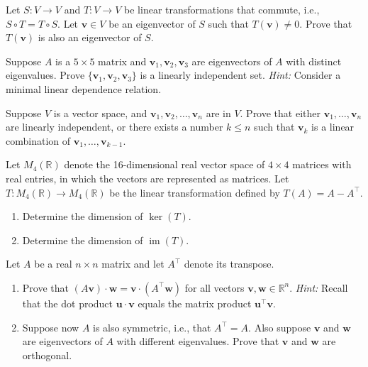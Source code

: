 \documentclass[11pt,twoside,openany]{memoir}
\begin{document}
        \begin{exercise}
        Let $S: V \to V$ and $T: V \to V$ be linear transformations that commute, i.e., $S \circ T = T \circ S$. Let $\mathbf{v} \in V$ be an eigenvector of $S$ such that $T(\mathbf{v}) \ne 0$. Prove that $T(\mathbf{v})$ is also an eigenvector of $S$.
        \end{exercise}
        
        \begin{exercise}
        Suppose $A$ is a $5 \times 5$ matrix and $\mathbf{v}_1, \mathbf{v}_2, \mathbf{v}_3$ are eigenvectors of $A$ with distinct eigenvalues. Prove $\{\mathbf{v}_1, \mathbf{v}_2, \mathbf{v}_3\}$ is a linearly independent set. \textit{Hint:} Consider a minimal linear dependence relation.
        \end{exercise}
        
        \begin{exercise}
        Suppose $V$ is a vector space, and $\mathbf{v}_1, \mathbf{v}_2, \ldots, \mathbf{v}_n$ are in $V$. Prove that either $\mathbf{v}_1, \ldots, \mathbf{v}_n$ are linearly independent, or there exists a number $k \le n$ such that $\mathbf{v}_k$ is a linear combination of $\mathbf{v}_1, \ldots, \mathbf{v}_{k-1}$.
        \end{exercise}
        
        \begin{exercise}
        Let $M_4(\mathbb{R})$ denote the 16-dimensional real vector space of $4 \times 4$ matrices with real entries, in which the vectors are represented as matrices. Let $T: M_4(\mathbb{R}) \to M_4(\mathbb{R})$ be the linear transformation defined by $T(A) = A - A^\top$.
        \begin{enumerate}[label=(\alph*)]
            \item Determine the dimension of $\operatorname{ker}(T)$.
            \item Determine the dimension of $\operatorname{im}(T)$.
        \end{enumerate}
        \end{exercise}
        
        \begin{exercise}
        Let $A$ be a real $n \times n$ matrix and let $A^\top$ denote its transpose.
        \begin{enumerate}[label=(\alph*)]
            \item Prove that $(A \mathbf{v}) \cdot \mathbf{w} = \mathbf{v} \cdot (A^\top \mathbf{w})$ for all vectors $\mathbf{v}, \mathbf{w} \in \mathbb{R}^n$. \textit{Hint:} Recall that the dot product $\mathbf{u} \cdot \mathbf{v}$ equals the matrix product $\mathbf{u}^\top \mathbf{v}$.
            \item Suppose now $A$ is also symmetric, i.e., that $A^\top = A$. Also suppose $\mathbf{v}$ and $\mathbf{w}$ are eigenvectors of $A$ with different eigenvalues. Prove that $\mathbf{v}$ and $\mathbf{w}$ are orthogonal.
        \end{enumerate}
        \end{exercise}
        
\end{document}
